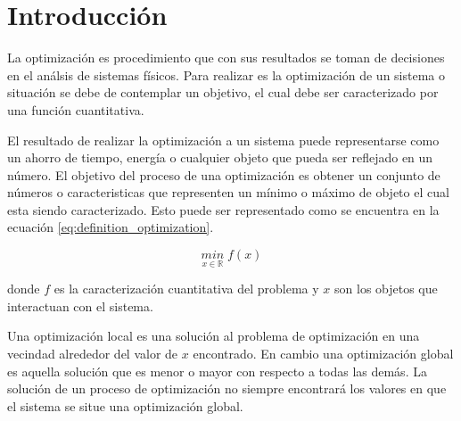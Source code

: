 \section{Introducción}

La optimización es procedimiento que con sus resultados se toman de decisiones en el análsis de sistemas físicos. Para realizar es la optimización de un sistema o situación se debe de contemplar un objetivo, el cual debe ser caracterizado por una función cuantitativa.

El resultado de realizar la optimización a un sistema puede representarse como un ahorro de tiempo, energía o cualquier objeto que pueda ser reflejado en un número. El objetivo del proceso de una optimización es obtener un conjunto de números o caracteristicas que representen un mínimo o máximo de objeto el cual esta siendo caracterizado. Esto puede ser representado como se encuentra en la ecuación \ref{eq:definition_optimization}.

\begin{equation}
    \underset{x\in \mathbb{R}}{min} \; f(x)
    \label{eq:definition_optimization}
\end{equation}

donde $f$ es la caracterización cuantitativa del problema y $x$ son los objetos que interactuan con el sistema.

Una optimización local es una solución al problema de optimización en una vecindad alrededor del valor de $x$ encontrado. En cambio una optimización global es aquella solución que es menor o mayor con respecto a todas las demás. La solución de un proceso de optimización no siempre encontrará los valores en que el sistema se situe una optimización global.